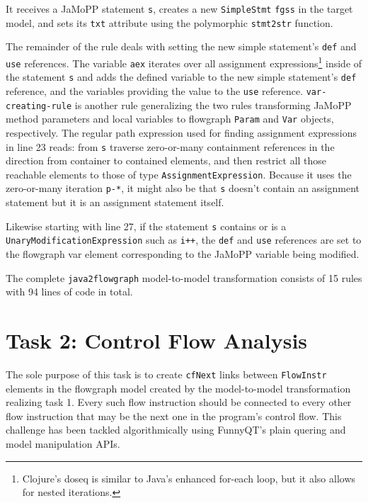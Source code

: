 \documentclass[11pt]{article}
\begin{document}
It receives a JaMoPP statement \verb|s|, creates a new \verb|SimpleStmt|
\verb|fgss| in the target model, and sets its \verb|txt| attribute using the
polymorphic \verb|stmt2str| function.

The remainder of the rule deals with setting the new simple statement's
\verb|def| and \verb|use| references.  The variable \verb|aex| iterates over
all assignment expressions\footnote{Clojure's \textsf{doseq} is similar to
  Java's enhanced for-each loop, but it also allows for nested iterations.}
inside of the statement \verb|s| and adds the defined variable to the new
simple statement's \verb|def| reference, and the variables providing the value
to the \verb|use| reference.  \verb|var-creating-rule| is another rule
generalizing the two rules transforming JaMoPP method parameters and local
variables to flowgraph \verb|Param| and \verb|Var| objects, respectively.  The
regular path expression used for finding assignment expressions in line 23
reads: from \verb|s| traverse zero-or-many containment references in the
direction from container to contained elements, and then restrict all those
reachable elements to those of type \verb|AssignmentExpression|.  Because it
uses the zero-or-many iteration \verb|p-*|, it might also be that \verb|s|
doesn't contain an assignment statement but it is an assignment statement
itself.

Likewise starting with line 27, if the statement \verb|s| contains or is a
\verb|UnaryModificationExpression| such as \verb|i++|, the \verb|def| and
\verb|use| references are set to the flowgraph var element corresponding to the
JaMoPP variable being modified.

The complete \verb|java2flowgraph| model-to-model transformation consists of 15
rules with 94 lines of code in total.



\section{Task 2: Control Flow Analysis}
\label{sec:task-2}

The sole purpose of this task is to create \verb|cfNext| links between
\verb|FlowInstr| elements in the flowgraph model created by the model-to-model
transformation realizing task 1.  Every such flow instruction should be
connected to every other flow instruction that may be the next one in the
program's control flow.  This challenge has been tackled algorithmically using
FunnyQT's plain quering and model manipulation APIs.
\end{document}
